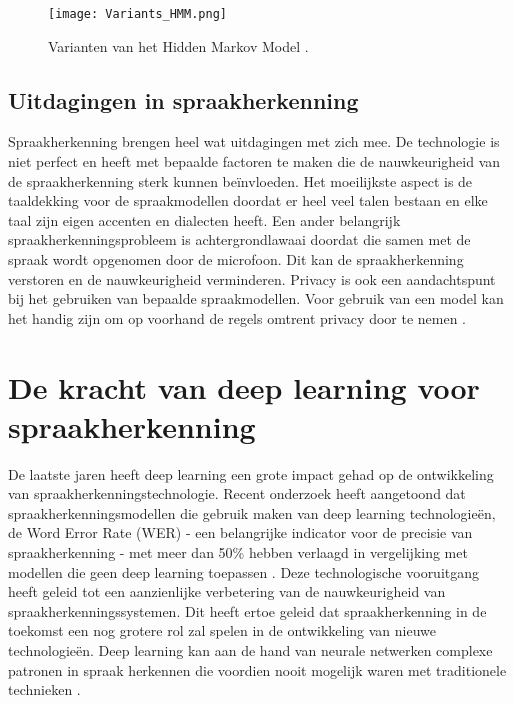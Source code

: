 \begin{figure}[H]
  \centering
  \texttt{[image: Variants\_HMM.png]}
  \caption{Varianten van het Hidden Markov Model \autocite{Choi2020}.}
\end{figure}

\subsection{Uitdagingen in spraakherkenning}
Spraakherkenning brengen heel wat uitdagingen met zich mee. De technologie is niet perfect en heeft met bepaalde factoren te maken die de nauwkeurigheid van de spraakherkenning sterk kunnen beïnvloeden. Het moeilijkste aspect is de taaldekking voor de spraakmodellen doordat er heel veel talen bestaan en elke taal zijn eigen accenten en dialecten heeft. Een ander belangrijk spraakherkenningsprobleem is achtergrondlawaai doordat die samen met de spraak wordt opgenomen door de microfoon. Dit kan de spraakherkenning verstoren en de nauwkeurigheid verminderen. Privacy is ook een aandachtspunt bij het gebruiken van bepaalde spraakmodellen. Voor gebruik van een model kan het handig zijn om op voorhand de regels omtrent privacy door te nemen \autocite{Tate2020}.


\section{De kracht van deep learning voor spraakherkenning}
De laatste jaren heeft deep learning een grote impact gehad op de ontwikkeling van spraakherkenningstechnologie. Recent onderzoek heeft aangetoond dat spraakherkenningsmodellen die gebruik maken van deep learning technologieën, de Word Error Rate (WER) - een belangrijke indicator voor de precisie van spraakherkenning - met meer dan 50\% hebben verlaagd in vergelijking met modellen die geen deep learning toepassen \autocite{Prabhavalkar2024}. Deze technologische vooruitgang heeft geleid tot een aanzienlijke verbetering van de nauwkeurigheid van spraakherkenningssystemen. Dit heeft ertoe geleid dat spraakherkenning in de toekomst een nog grotere rol zal spelen in de ontwikkeling van nieuwe technologieën. Deep learning kan aan de hand van neurale netwerken complexe patronen in spraak herkennen die voordien nooit mogelijk waren met traditionele technieken \autocite{Prabhavalkar2024}.

